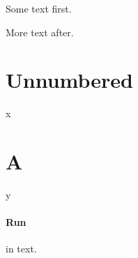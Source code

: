 \documentclass{article}
\begin{document}
Some text first.

\tableofcontents
More text after.

\section*{Unnumbered}
x
\section{A}
y
\paragraph{Run} in text.
\end{document}
